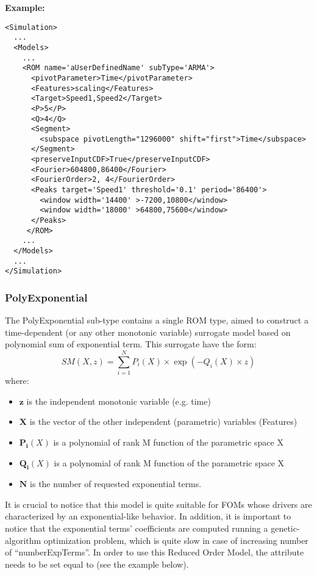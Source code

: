 \textbf{Example:}
\begin{lstlisting}[style=XML,morekeywords={name,subType,pivotLength,shift,target,threshold,period,width}]
<Simulation>
  ...
  <Models>
    ...
    <ROM name='aUserDefinedName' subType='ARMA'>
      <pivotParameter>Time</pivotParameter>
      <Features>scaling</Features>
      <Target>Speed1,Speed2</Target>
      <P>5</P>
      <Q>4</Q>
      <Segment>
        <subspace pivotLength="1296000" shift="first">Time</subspace>
      </Segment>
      <preserveInputCDF>True</preserveInputCDF>
      <Fourier>604800,86400</Fourier>
      <FourierOrder>2, 4</FourierOrder>
      <Peaks target='Speed1' threshold='0.1' period='86400'>
        <window width='14400' >-7200,10800</window>
        <window width='18000' >64800,75600</window>
      </Peaks>
     </ROM>
    ...
  </Models>
  ...
</Simulation>
\end{lstlisting}

\subsubsection{PolyExponential}
\label{subsubsec:polyexponential}
The PolyExponential sub-type contains a single ROM type, aimed to construct a time-dependent (or any other monotonic
variable) surrogate model based on polynomial sum of exponential term. This surrogate have the form:
%
\begin{equation}
  SM(X,z) = \sum_{i=1}^{N} P_{i}(X) \times \exp ( - Q_{i}(X) \times z )
\end{equation}
where:
\begin{itemize}
  \item $\mathbf{z}$ is the independent  monotonic variable (e.g. time)
  \item $\mathbf{X}$  is the vector of the other independent (parametric) variables  (Features)
  \item $\mathbf{P_{i}}(X)$ is a polynomial of rank M function of the parametric space X
  \item  $\mathbf{Q_{i}}(X)$ is a polynomial of rank M function of the parametric space X
  \item  $\mathbf{N}$ is the number of requested exponential terms.
\end{itemize}
It is crucial to notice that this model is quite suitable for FOMs whose drivers are characterized by an exponential-like behavior.
In addition, it is important to notice that the exponential terms' coefficients are computed running a genetic-algorithm optimization
problem, which is quite slow in case of increasing number of ``numberExpTerms''.
%
In order to use this Reduced Order Model, the  attribute
 needs to be set equal to  (see the example
below).
%
\subnodeIntro

